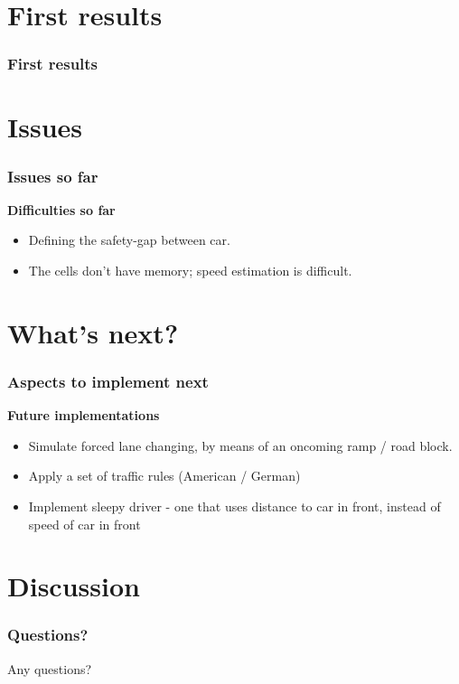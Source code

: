 \documentclass{beamer}
\begin{document}
\section{First results}
\begin{frame}
\frametitle{First results}
\end{frame}



\section{Issues}
\begin{frame}
\frametitle{Issues so far}
\bf{Difficulties so far}
\begin{itemize}
\item Defining the safety-gap between car.
\item The cells don't have memory; speed estimation is difficult. 
\end{itemize}
\end{frame}


\section{What's next?}
\begin{frame}
\frametitle{Aspects to implement next}
\bf{Future implementations}
\begin{itemize}
\item Simulate forced lane changing, by means of an oncoming ramp / road block.
\item Apply a set of traffic rules (American / German)
\item Implement sleepy driver - one that uses distance to car in front, instead of speed of car in front
\end{itemize}
\end{frame}

\section{Discussion}
\begin{frame}
\frametitle{Questions?}
\begin{center}
Any questions?
\end{center}
\end{frame}
\end{document}

